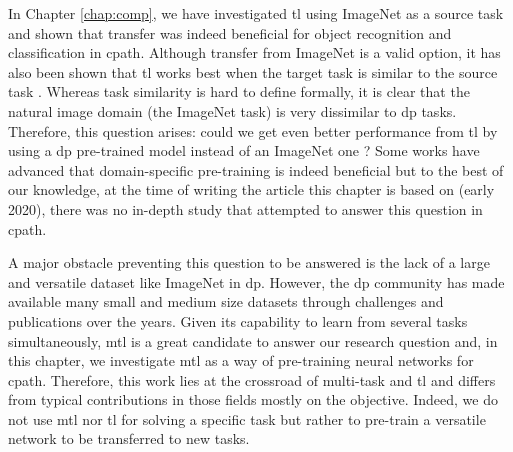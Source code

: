 
In Chapter \ref{chap:comp}, we have investigated \acrlong{tl} using ImageNet \parencite{deng2009imagenet} as a source task and shown that transfer was indeed beneficial for object recognition and classification in \acrlong{cpath}. Although transfer from ImageNet is a valid option, it has also been shown that \acrlong{tl} works best when the target task is similar to the source task \parencite{yosinski2014transferable,mensink2021factors}. Whereas task similarity is hard to define formally, it is clear that the natural image domain (\ie the ImageNet task) is very dissimilar to \acrlong{dp} tasks. Therefore, this question arises: could we get even better performance from \acrlong{tl} by using a \acrlong{dp} pre-trained model instead of an ImageNet one ? Some works \parencite{khan2019improving, medela2019few, kraus2017automated, shang2019and} have advanced that domain-specific pre-training is indeed beneficial but to the best of our knowledge, at the time of writing the article this chapter is based on (early 2020), there was no in-depth study that attempted to answer this question in \acrlong{cpath}. 

A major obstacle preventing this question to be answered is the lack of a large and versatile dataset like ImageNet in \acrlong{dp}. However, the \acrlong{dp} community has made available many small and medium size datasets through challenges and publications over the years. Given its capability to learn from several tasks simultaneously, \acrlong{mtl} is a great candidate to answer our research question and, in this chapter, we investigate \acrshort{mtl} as a way of pre-training neural networks for \acrlong{cpath}. Therefore, this work lies at the crossroad of multi-task and \acrlong{tl} and differs from typical contributions in those fields mostly on the objective. Indeed, we do not use \acrshort{mtl} nor \acrlong{tl} for solving a specific task but rather to pre-train a versatile network to be transferred to new tasks. 

